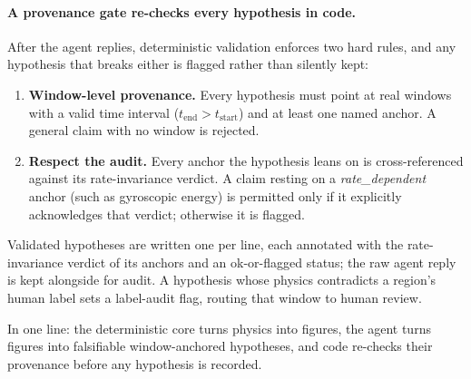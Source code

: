 \documentclass[11pt]{article}
\begin{document}
\paragraph{A provenance gate re-checks every hypothesis in code.} After the agent
replies, deterministic validation enforces two hard rules, and any hypothesis that
breaks either is flagged rather than silently kept:
\begin{enumerate}[leftmargin=2em, itemsep=2pt]
  \item \textbf{Window-level provenance.} Every hypothesis must point at real windows
        with a valid time interval ($t_\text{end} > t_\text{start}$) and at least one
        named anchor. A general claim with no window is rejected.
  \item \textbf{Respect the audit.} Every anchor the hypothesis leans on is
        cross-referenced against its rate-invariance verdict. A claim resting on a
        \emph{rate\_dependent} anchor (such as gyroscopic energy) is permitted only if
        it explicitly acknowledges that verdict; otherwise it is flagged.
\end{enumerate}
Validated hypotheses are written one per line, each annotated with the rate-invariance
verdict of its anchors and an ok-or-flagged status; the raw agent reply is kept
alongside for audit. A hypothesis whose physics contradicts a region's human label
sets a label-audit flag, routing that window to human review.

In one line: the deterministic core turns physics into figures, the agent turns
figures into falsifiable window-anchored hypotheses, and code re-checks their
provenance before any hypothesis is recorded.
\end{document}
